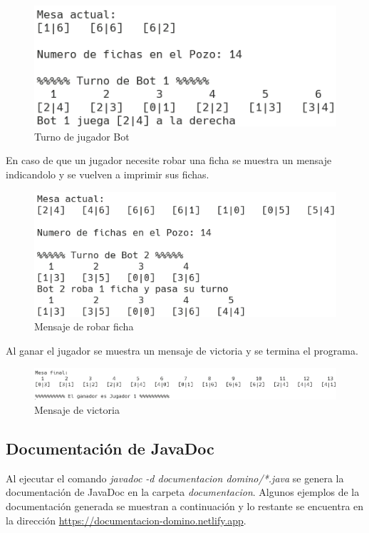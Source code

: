 \documentclass[12pt]{article}
\begin{document}
  \begin{figure}[h!]
    \centering
    \includegraphics{pf4.png}
    \caption{Turno de jugador Bot}
  \end{figure}

  En caso de que un jugador necesite robar una ficha se muestra un mensaje indicandolo y se vuelven a imprimir sus fichas.

  \begin{figure}[h!]
    \centering
    \includegraphics{pf5.png}
    \caption{Mensaje de robar ficha} 
  \end{figure}

  Al ganar el jugador se muestra un mensaje de victoria y se termina el programa.

  \begin{figure}[h!]
    \centering
    \includegraphics[scale=0.8]{pf6.png}
    \caption{Mensaje de victoria}
  \end{figure}

  \subsection{Documentación de JavaDoc}
  Al ejecutar el comando \textit{javadoc -d documentacion domino/*.java} se genera la documentación de JavaDoc en la carpeta \textit{documentacion}. Algunos ejemplos de la documentación generada se muestran a continuación y lo restante se encuentra en la dirección \url{https://documentacion-domino.netlify.app}.
\end{document}
